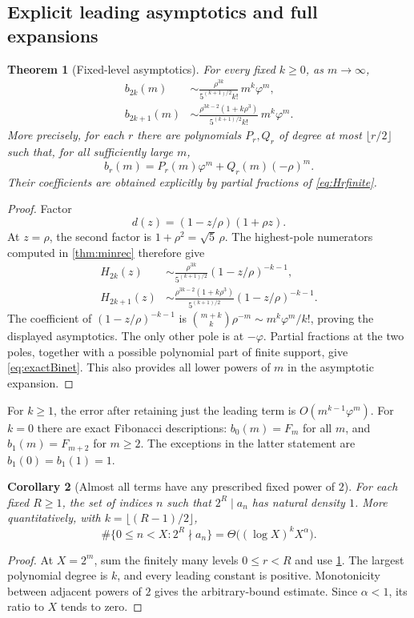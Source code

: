 \documentclass[11pt]{article}
\newtheorem{theorem}{Theorem}[section]
\newtheorem{corollary}[theorem]{Corollary}
\theoremstyle{definition}\newtheorem{definition}[theorem]{Definition}
\theoremstyle{remark}\newtheorem{remark}[theorem]{Remark}
\newcommand{\ph}{\varphi}
\begin{document}
\subsection{Explicit leading asymptotics and full expansions}
\begin{theorem}[Fixed-level asymptotics]\label{thm:fixedasymp}
For every fixed $k\geq0$, as $m\to\infty$,
\begin{align}
 b_{2k}(m)&\sim
 \frac{\rho^{3k}}{5^{(k+1)/2}k!}\,m^k\ph^m,\label{eq:evenasymp}\\
 b_{2k+1}(m)&\sim
 \frac{\rho^{3k-2}(1+k\rho^3)}{5^{(k+1)/2}k!}\,m^k\ph^m.
 \label{eq:oddasymp}
\end{align}
More precisely, for each $r$ there are polynomials $P_r,Q_r$ of degree
at most $\lfloor r/2\rfloor$ such that, for all sufficiently large $m$,
\begin{equation}\label{eq:exactBinet}
 b_r(m)=P_r(m)\ph^m+Q_r(m)(-\rho)^m.
\end{equation}
Their coefficients are obtained explicitly by partial fractions of
\eqref{eq:Hrfinite}.
\end{theorem}
\begin{proof}
Factor
\[
 d(z)=(1-z/\rho)(1+\rho z).
\]
At $z=\rho$, the second factor is $1+\rho^2=\sqrt5\,\rho$.
The highest-pole numerators computed in \cref{thm:minrec} therefore give
\begin{align*}
 H_{2k}(z)&\sim
 \frac{\rho^{3k}}{5^{(k+1)/2}}(1-z/\rho)^{-k-1},\\
 H_{2k+1}(z)&\sim
 \frac{\rho^{3k-2}(1+k\rho^3)}{5^{(k+1)/2}}
 (1-z/\rho)^{-k-1}.
\end{align*}
The coefficient of $(1-z/\rho)^{-k-1}$ is
$\binom{m+k}{k}\rho^{-m}\sim m^k\ph^m/k!$, proving the displayed
asymptotics. The only other pole is at $-\ph$. Partial fractions at the
two poles, together with a possible polynomial part of finite support,
give \eqref{eq:exactBinet}. This also provides all lower powers of $m$
in the asymptotic expansion.
\end{proof}

For $k\geq1$, the error after retaining just the leading term is
$O(m^{k-1}\ph^m)$. For $k=0$ there are exact Fibonacci descriptions:
$b_0(m)=F_m$ for all $m$, and $b_1(m)=F_{m+2}$ for $m\geq2$.
The exceptions in the latter statement are $b_1(0)=b_1(1)=1$.

\begin{corollary}[Almost all terms have any prescribed fixed power of $2$]\label{cor:density}
For each fixed $R\geq1$, the set of indices $n$ such that $2^R\mid a_n$
has natural density $1$. More quantitatively, with
$k=\lfloor(R-1)/2\rfloor$,
\[
 \#\{0\leq n<X:2^R\nmid a_n\}
 =\Theta\bigl((\log X)^kX^\alpha\bigr).
\]
\end{corollary}
\begin{proof}
At $X=2^m$, sum the finitely many levels $0\leq r<R$ and use
\cref{thm:fixedasymp}. The largest polynomial degree is $k$, and every
leading constant is positive. Monotonicity between adjacent powers of
$2$ gives the arbitrary-bound estimate. Since $\alpha<1$, its ratio to
$X$ tends to zero.
\end{proof}
\end{document}
